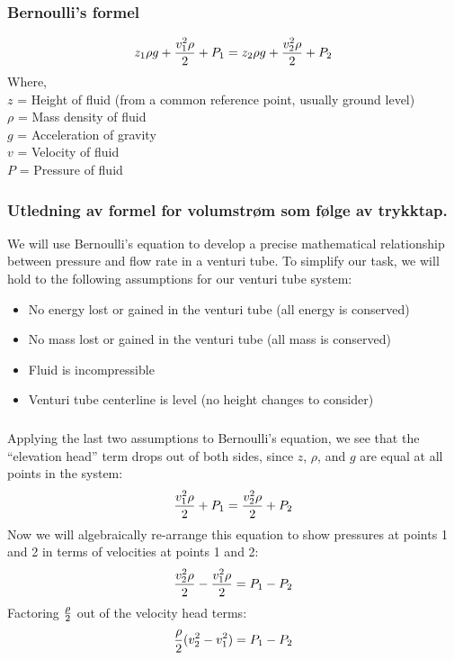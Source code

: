 \documentclass{beamer}
\begin{document}
%
\begin{frame}
	\frametitle{Bernoulli's formel}

	


%
$$z_1 \rho g + {v_1^2 \rho \over 2} + P_1 = z_2 \rho g + {v_2^2 \rho \over 2} + P_2$$
%
Where,\\
%
$z$ = Height of fluid (from a common reference point, usually ground level)\\
%
$\rho$ = Mass density of fluid\\
%
	$g$ = Acceleration of gravity\\
%
$v$ = Velocity of fluid\\
%
$P$ = Pressure of fluid\\
%
\end{frame}
%
\begin{frame}
	\frametitle{Utledning av formel for volumstrøm som følge av trykktap. }

	



%
We will use Bernoulli's equation to develop a precise mathematical relationship between pressure and flow rate in a venturi tube.  To simplify our task, we will hold to the following assumptions for our venturi tube system:
%
\begin{itemize}
\item No energy lost or gained in the venturi tube (all energy is conserved)
\item No mass lost or gained in the venturi tube (all mass is conserved)
\item Fluid is incompressible
\item Venturi tube centerline is level (no height changes to consider)
\end{itemize}
%
\end{frame}
\begin{frame}
	\frametitle{}

	


Applying the last two assumptions to Bernoulli's equation, we see that the ``elevation head'' term drops out of both sides, since $z$, $\rho$, and $g$ are equal at all points in the system:
%
$${v_1^2 \rho \over 2} + P_1 = {v_2^2 \rho \over 2} + P_2$$
%
Now we will algebraically re-arrange this equation to show pressures at points 1 and 2 in terms of velocities at points 1 and 2:
%
$${v_2^2 \rho \over 2} - {v_1^2 \rho \over 2} = P_1 - P_2$$
%
Factoring $\rho \over 2$ out of the velocity head terms:
%
$${\rho \over 2} (v_2^2 - v_1^2) = P_1 - P_2$$
%
\end{frame}
\end{document}
